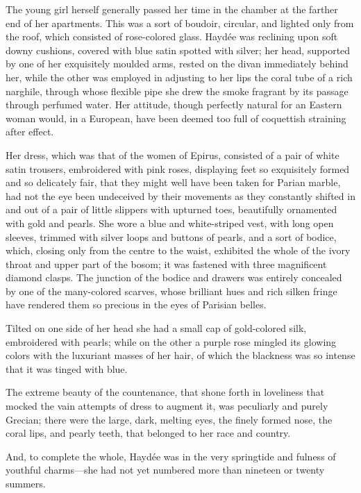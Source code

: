 The young girl herself generally passed her time in the chamber at the
farther end of her apartments. This was a sort of boudoir, circular,
and lighted only from the roof, which consisted of rose-colored glass.
Haydée was reclining upon soft downy cushions, covered with blue satin
spotted with silver; her head, supported by one of her exquisitely
moulded arms, rested on the divan immediately behind her, while the
other was employed in adjusting to her lips the coral tube of a rich
narghile, through whose flexible pipe she drew the smoke fragrant by
its passage through perfumed water. Her attitude, though perfectly
natural for an Eastern woman would, in a European, have been deemed too
full of coquettish straining after effect.

Her dress, which was that of the women of Epirus, consisted of a pair
of white satin trousers, embroidered with pink roses, displaying feet
so exquisitely formed and so delicately fair, that they might well have
been taken for Parian marble, had not the eye been undeceived by their
movements as they constantly shifted in and out of a pair of little
slippers with upturned toes, beautifully ornamented with gold and
pearls. She wore a blue and white-striped vest, with long open sleeves,
trimmed with silver loops and buttons of pearls, and a sort of bodice,
which, closing only from the centre to the waist, exhibited the whole
of the ivory throat and upper part of the bosom; it was fastened with
three magnificent diamond clasps. The junction of the bodice and
drawers was entirely concealed by one of the many-colored scarves,
whose brilliant hues and rich silken fringe have rendered them so
precious in the eyes of Parisian belles.

Tilted on one side of her head she had a small cap of gold-colored
silk, embroidered with pearls; while on the other a purple rose mingled
its glowing colors with the luxuriant masses of her hair, of which the
blackness was so intense that it was tinged with blue.

The extreme beauty of the countenance, that shone forth in loveliness
that mocked the vain attempts of dress to augment it, was peculiarly
and purely Grecian; there were the large, dark, melting eyes, the
finely formed nose, the coral lips, and pearly teeth, that belonged to
her race and country.

And, to complete the whole, Haydée was in the very springtide and
fulness of youthful charms—she had not yet numbered more than nineteen
or twenty summers.

